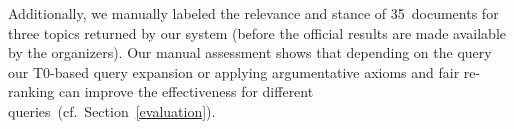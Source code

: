 Additionally, we manually labeled the relevance and stance of 35~documents for three topics returned by our system (before the official results are made available by the organizers). Our manual assessment shows that depending on the query our T0-based query expansion or applying argumentative axioms and fair re-ranking can improve the effectiveness for different queries~(cf.\ Section~\ref{evaluation}).

